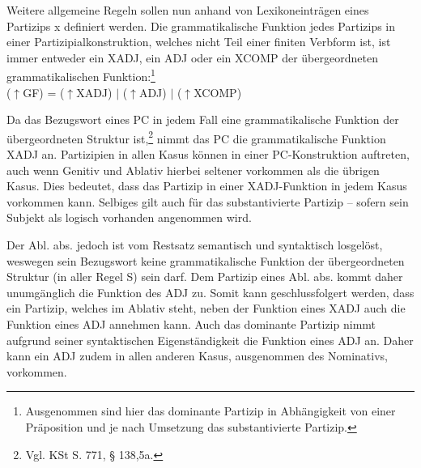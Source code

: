 \documentclass[12pt,a4paper]{article}
\begin{document}

Weitere allgemeine Regeln sollen nun anhand von Lexikoneinträgen eines Partizips x definiert werden.
Die grammatikalische Funktion jedes Partizips in einer Partizipialkonstruktion, welches nicht Teil einer finiten Verbform ist, ist immer entweder ein XADJ, ein ADJ oder ein XCOMP der übergeordneten grammatikalischen Funktion:\footnote{Ausgenommen sind hier das dominante Partizip in Abhängigkeit von einer Präposition und je nach Umsetzung das substantivierte Partizip.} \\
($\uparrow$GF) = ($\uparrow$XADJ) $\mid$ ($\uparrow$ADJ) $\mid$ ($\uparrow$XCOMP)

Da das Bezugswort eines PC in jedem Fall eine grammatikalische Funktion der übergeordneten Struktur ist,\footnote{Vgl. KSt S. 771, § 138,5a.} nimmt das PC die grammatikalische Funktion XADJ an. Partizipien in allen Kasus können in einer PC-Konstruktion auftreten, auch wenn Genitiv und Ablativ hierbei seltener vorkommen als die übrigen Kasus. Dies bedeutet, dass das Partizip in einer XADJ-Funktion in jedem Kasus vorkommen kann. Selbiges gilt auch für das substantivierte Partizip -- sofern sein Subjekt als logisch vorhanden angenommen wird.

Der Abl. abs. jedoch ist vom Restsatz semantisch und syntaktisch losgelöst, weswegen sein Bezugswort keine grammatikalische Funktion der übergeordneten Struktur (in aller Regel S) sein darf. Dem Partizip eines Abl. abs. kommt daher unumgänglich die Funktion des ADJ zu. Somit kann geschlussfolgert werden, dass ein Partizip, welches im Ablativ steht, neben der Funktion eines XADJ auch die Funktion eines ADJ annehmen kann. Auch das dominante Partizip nimmt aufgrund seiner syntaktischen Eigenständigkeit die Funktion eines ADJ an. Daher kann ein ADJ zudem in allen anderen Kasus, ausgenommen des Nominativs, vorkommen.
\end{document}
